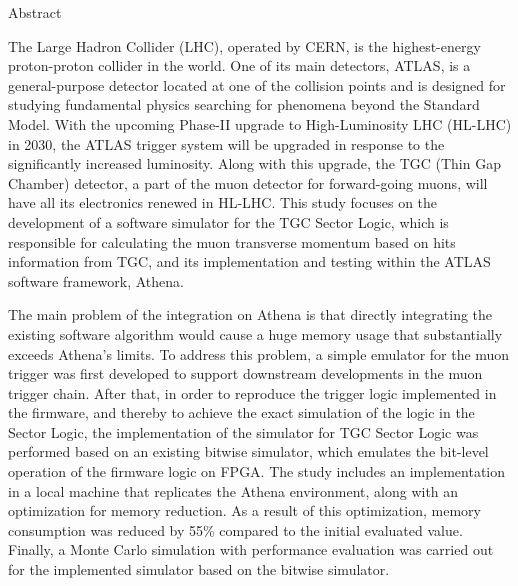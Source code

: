 \begin{abstractpage}{Abstract}



    The Large Hadron Collider (LHC), operated by CERN, is the highest-energy proton-proton collider in the world. One of its main detectors, ATLAS, is a general-purpose detector located at one of the collision points and is designed for studying fundamental physics searching for phenomena beyond the Standard Model. With the upcoming Phase-II upgrade to High-Luminosity LHC (HL-LHC) in 2030, the ATLAS trigger system will be upgraded in response to the significantly increased luminosity. Along with this upgrade, the TGC (Thin Gap Chamber) detector, a part of the muon detector for forward-going muons, will have all its electronics renewed in HL-LHC. This study focuses on the development of a software simulator for the TGC Sector Logic, which is responsible for calculating the muon transverse momentum based on hits information from TGC, and its implementation and testing within the ATLAS software framework, Athena.

    The main problem of the integration on Athena is that directly integrating the existing software algorithm would cause a huge memory usage that substantially exceeds Athena’s limits. To address this problem, a simple emulator for the muon trigger was first developed to support downstream developments in the muon trigger chain. After that, in order to reproduce the trigger logic implemented in the firmware, and thereby to achieve the exact simulation of the logic in the Sector Logic, the implementation of the simulator for TGC Sector Logic was performed based on an existing bitwise simulator, which emulates the bit-level operation of the firmware logic on FPGA. The study includes an implementation in a local machine that replicates the Athena environment, along with an optimization for memory reduction. As a result of this optimization, memory consumption was reduced by 55\% compared to the initial evaluated value. Finally, a Monte Carlo simulation with performance evaluation was carried out for the implemented simulator based on the bitwise simulator.

\end{abstractpage}
